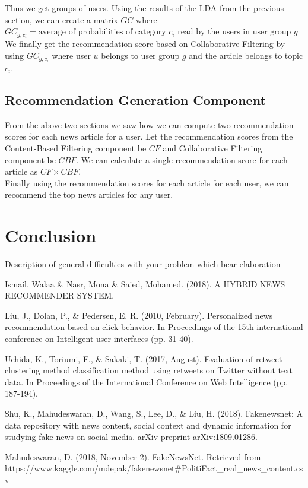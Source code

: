 \documentclass{article}
\begin{document}
Thus we get groups of users. Using the results of the LDA from the previous section, we can create a matrix $GC$ where $GC_{g, c_i} = \textrm{average of probabilities of category $c_i$ read by the users in user group $g$}$ \\

We finally get the recommendation score based on Collaborative Filtering by using $GC_{g, c_i}$ where user $u$ belongs to user group $g$ and the article belongs to topic $c_i$.
\subsection{Recommendation Generation Component}

From the above two sections we saw how we can compute two recommendation scores for each news article for a user. Let the recommendation scores from the Content-Based Filtering component be $CF$ and Collaborative Filtering component be $CBF$. We can calculate a single recommendation score for each article as $CF \times CBF$. \\

Finally using the recommendation scores for each article for each user, we can recommend the top news articles for any user. \\


\section{Conclusion}

{Description of general difficulties with your problem which bear elaboration
}

\begin{thebibliography}{9}

 Ismail, Walaa \& Nasr, Mona \& Saied, Mohamed. (2018). A HYBRID NEWS RECOMMENDER SYSTEM.

 Liu, J., Dolan, P., \& Pedersen, E. R. (2010, February). Personalized news recommendation based on click behavior. In Proceedings of the 15th international conference on Intelligent user interfaces (pp. 31-40).

 Uchida, K., Toriumi, F., \& Sakaki, T. (2017, August). Evaluation of retweet clustering method classification method using retweets on Twitter without text data. In Proceedings of the International Conference on Web Intelligence (pp. 187-194).

 Shu, K., Mahudeswaran, D., Wang, S., Lee, D., & Liu, H. (2018). Fakenewsnet: A data repository with news content, social context and dynamic information for studying fake news on social media. arXiv preprint arXiv:1809.01286.

 Mahudeswaran, D. (2018, November 2). FakeNewsNet. Retrieved from https://www.kaggle.com/mdepak/fakenewsnet#PolitiFact\_real\_news\_content.csv
\end{thebibliography}
\end{document}

